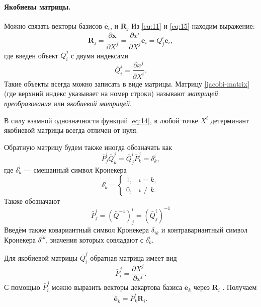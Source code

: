 \paragraph {Якобиевы матрицы.} Можно связать векторы базисов
$\bar{\textbf{e}}_i$, и $\textbf{R}_j$  Из \eqref{eq:11}  и \eqref{eq:15}
находим выражение:
\begin{equation}
\label{eq:16}
    \textbf{R}_j = \frac{\partial\textbf{x}}{\partial X^j} = \frac{\partial
    x^i}{\partial X^j} \bar{\textbf{e}}_i = Q^i_j \bar{\textbf{e}}_i,
\end{equation}
где введен объект $\bar{Q}^j_i$ с двумя индексами
\begin{equation}\label{jacobi-matrix}
    \bar{Q}^j_i= \frac{\partial x^j}{\partial X^i}.
\end{equation}
Такие объекты всегда можно записать в виде матрицы. Матрицу
\eqref{jacobi-matrix} (где верхний индекс указывает на номер строки) называют
\emph{матрицей преобразования} или
\emph{якобиевой матрицей}.

В силу взамной однозначности функций \eqref{eq:14}, в любой точке $X^i$
детерминант якобиевой матрицы всегда отличен от нуля.

Обратную матрицу будем также иногда обозначать как 
\begin{equation}
\label{eq:19}
    \bar{P}^i_j\bar{Q}^j_k = \bar{Q}^i_j\bar{P}^j_k  = \delta^i_k,
\end{equation}
где $\delta^i_k$ --- смешанный символ Кронекера
\begin{equation}
\label{eq:110}
    \delta^i_k = \begin{cases}
      1, & i = k, \\
      0, & i \ne k.
    \end{cases}
\end{equation}
Также обозначают
\begin{equation}
\bar{P}^i_j= (\bar{Q}^{-1})^i_j   = (\bar{Q}^i_j)^{-1} 
\end{equation}
Введём также ковариантный символ Кронекера $\delta_{ik}$  и контравариантный
символ Кронекера $\delta^{ik}$, значения которых совладают с $\delta^i_k$.

Для якобиевой матрицы $\bar{Q}^j_i$ обратная матрица имеет вид
\begin{equation}
\label{eq:111}
    \bar{P}^j_i= \frac{\partial X^j}{\partial x^i}.
\end{equation}
С помощью $\bar{P}^j_i$ можно выразить векторы декартова базиса
$\bar{\mathbf{e}}_k$ через $\textbf{R}_i$ . Получаем
\begin{equation}
\label{eq:112}
\bar{\mathbf{e}}_k = \bar{P}^i_k \textbf{R}_i.
\end{equation}


